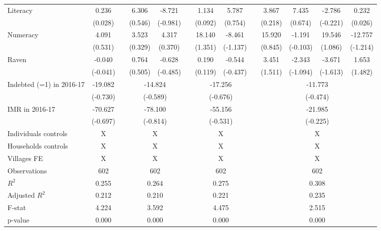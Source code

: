 \begin{table}[htbp]
{\begin{tabular}{lcccccccccccc}
    Literacy & 0.236 &       & 6.306 & -8.721 &       & 1.134 & 5.787 &       & 3.867 & 7.435 & -2.786 & 0.232 \\
          & (0.028) &       & (0.546) & (-0.981) &       & (0.092) & (0.754) &       & (0.218) & (0.674) & (-0.221) & (0.026) \\
    Numeracy & 4.091 &       & 3.523 & 4.317 &       & 18.140 & -8.461 &       & 15.920 & -1.191 & 19.546 & -12.757 \\
          & (0.531) &       & (0.329) & (0.370) &       & (1.351) & (-1.137) &       & (0.845) & (-0.103) & (1.086) & (-1.214) \\
    Raven & -0.040 &       & 0.764 & -0.628 &       & 0.190 & -0.544 &       & 3.451 & -2.343 & -3.671 & 1.653 \\
          & (-0.041) &       & (0.505) & (-0.485) &       & (0.119) & (-0.437) &       & (1.511) & (-1.094) & (-1.613) & (1.482) \\
\cmidrule{1-2}\cmidrule{4-5}\cmidrule{7-8}\cmidrule{10-13}    Indebted (=1) in 2016-17 & -19.082 &       & \multicolumn{2}{c}{-14.824} &       & \multicolumn{2}{c}{-17.256} &       & \multicolumn{4}{c}{-11.773} \\
          & (-0.730) &       & \multicolumn{2}{c}{(-0.589)} &       & \multicolumn{2}{c}{(-0.676)} &       & \multicolumn{4}{c}{(-0.474)} \\
    IMR in 2016-17 & -70.627 &       & \multicolumn{2}{c}{-78.100} &       & \multicolumn{2}{c}{-55.156} &       & \multicolumn{4}{c}{-21.985} \\
          & (-0.697) &       & \multicolumn{2}{c}{(-0.814)} &       & \multicolumn{2}{c}{(-0.531)} &       & \multicolumn{4}{c}{(-0.225)} \\
    Individuals controls & X     &       & \multicolumn{2}{c}{X} &       & \multicolumn{2}{c}{X} &       & \multicolumn{4}{c}{X} \\
    Households controls & X     &       & \multicolumn{2}{c}{X} &       & \multicolumn{2}{c}{X} &       & \multicolumn{4}{c}{X} \\
    Villages FE & X     &       & \multicolumn{2}{c}{X} &       & \multicolumn{2}{c}{X} &       & \multicolumn{4}{c}{X} \\
    \midrule
    Observations & 602   &       & \multicolumn{2}{c}{602} &       & \multicolumn{2}{c}{602} &       & \multicolumn{4}{c}{602} \\
    $R^2$ & 0.255 &       & \multicolumn{2}{c}{0.264} &       & \multicolumn{2}{c}{0.275} &       & \multicolumn{4}{c}{0.308} \\
    Adjusted $R^2$ & 0.212 &       & \multicolumn{2}{c}{0.210} &       & \multicolumn{2}{c}{0.221} &       & \multicolumn{4}{c}{0.235} \\
    F-stat & 4.224 &       & \multicolumn{2}{c}{3.592} &       & \multicolumn{2}{c}{4.475} &       & \multicolumn{4}{c}{2.515} \\
    p-value & 0.000 &       & \multicolumn{2}{c}{0.000} &       & \multicolumn{2}{c}{0.000} &       & \multicolumn{4}{c}{0.000} \\
    \bottomrule


\end{tabular}}
\end{table}
